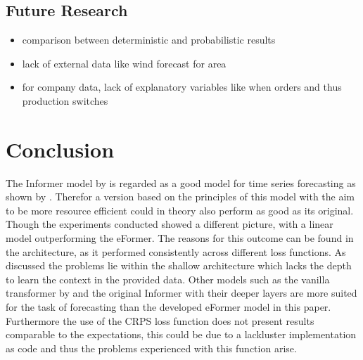 \documentclass{article}
\begin{document}
\subsection{Future Research}

\begin{itemize}
    \item comparison between deterministic and probabilistic results
    \item lack of external data like wind forecast for area
    \item for company data, lack of explanatory variables like when orders and thus production switches
\end{itemize}

\section{Conclusion}

The Informer model by \cite{Informer} is regarded as a good model for time series forecasting as shown by \cite{TS-ranking}. Therefor a version based on the principles of this model with the aim to be more resource efficient could in theory also perform as good as its original. Though the experiments conducted showed a different picture, with a linear model outperforming the eFormer. The reasons for this outcome can be found in the architecture, as it performed consistently across different loss functions. As discussed the problems lie within the shallow architecture which lacks the depth to learn the context in the provided data. Other models such as the vanilla transformer by \cite{vanilla-transformer} and the original Informer with their deeper layers are more suited for the task of forecasting than the developed eFormer model in this paper. Furthermore the use of the CRPS loss function does not present results comparable to the expectations, this could be due to a lackluster implementation as code and thus the problems experienced with this function arise. 


\newpage

\printbibliography
\end{document}
